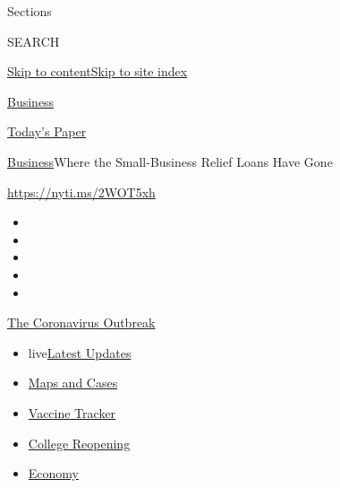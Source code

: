 Sections

SEARCH

\protect\hyperlink{site-content}{Skip to
content}\protect\hyperlink{site-index}{Skip to site index}

\href{https://www.nytimes.com/section/business}{Business}

\href{https://myaccount.nytimes.com/auth/login?response_type=cookie\&client_id=vi}{}

\href{https://www.nytimes.com/section/todayspaper}{Today's Paper}

\href{/section/business}{Business}\textbar{}Where the Small-Business
Relief Loans Have Gone

\url{https://nyti.ms/2WOT5xh}

\begin{itemize}
\item
\item
\item
\item
\item
\end{itemize}

\href{https://www.nytimes.com/news-event/coronavirus?action=click\&pgtype=Article\&state=default\&region=TOP_BANNER\&context=storylines_menu}{The
Coronavirus Outbreak}

\begin{itemize}
\tightlist
\item
  live\href{https://www.nytimes.com/2020/08/04/world/coronavirus-cases.html?action=click\&pgtype=Article\&state=default\&region=TOP_BANNER\&context=storylines_menu}{Latest
  Updates}
\item
  \href{https://www.nytimes.com/interactive/2020/us/coronavirus-us-cases.html?action=click\&pgtype=Article\&state=default\&region=TOP_BANNER\&context=storylines_menu}{Maps
  and Cases}
\item
  \href{https://www.nytimes.com/interactive/2020/science/coronavirus-vaccine-tracker.html?action=click\&pgtype=Article\&state=default\&region=TOP_BANNER\&context=storylines_menu}{Vaccine
  Tracker}
\item
  \href{https://www.nytimes.com/2020/08/02/us/covid-college-reopening.html?action=click\&pgtype=Article\&state=default\&region=TOP_BANNER\&context=storylines_menu}{College
  Reopening}
\item
  \href{https://www.nytimes.com/live/2020/08/04/business/stock-market-today-coronavirus?action=click\&pgtype=Article\&state=default\&region=TOP_BANNER\&context=storylines_menu}{Economy}
\end{itemize}

